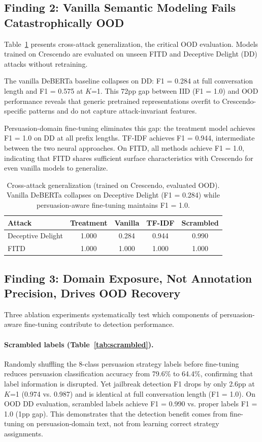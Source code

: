 \documentclass[11pt]{article}
\begin{document}
\subsection{Finding 2: Vanilla Semantic Modeling Fails Catastrophically OOD}

Table~\ref{tab:cross_attack} presents cross-attack generalization, the critical OOD evaluation. Models trained on Crescendo are evaluated on unseen FITD and Deceptive Delight (DD) attacks without retraining.

The vanilla DeBERTa baseline collapses on DD: F1 = 0.284 at full conversation length and F1 = 0.575 at $K$=1. This 72pp gap between IID (F1 = 1.0) and OOD performance reveals that generic pretrained representations overfit to Crescendo-specific patterns and do not capture attack-invariant features.

Persuasion-domain fine-tuning eliminates this gap: the treatment model achieves F1 = 1.0 on DD at all prefix lengths. TF-IDF achieves F1 = 0.944, intermediate between the two neural approaches. On FITD, all methods achieve F1 = 1.0, indicating that FITD shares sufficient surface characteristics with Crescendo for even vanilla models to generalize.

\begin{table}[t]
\centering
\caption{Cross-attack generalization (trained on Crescendo, evaluated OOD). Vanilla DeBERTa collapses on Deceptive Delight (F1 = 0.284) while persuasion-aware fine-tuning maintains F1 = 1.0.}
\label{tab:cross_attack}
\begin{tabular}{lcccc}
\toprule
\textbf{Attack} & \textbf{Treatment} & \textbf{Vanilla} & \textbf{TF-IDF} & \textbf{Scrambled} \\
\midrule
Deceptive Delight & 1.000 & 0.284 & 0.944 & 0.990 \\
FITD & 1.000 & 1.000 & 1.000 & 1.000 \\
\bottomrule
\end{tabular}
\end{table}

\subsection{Finding 3: Domain Exposure, Not Annotation Precision, Drives OOD Recovery}

Three ablation experiments systematically test which components of persuasion-aware fine-tuning contribute to detection performance.

\paragraph{Scrambled labels (Table~\ref{tab:scrambled}).}
Randomly shuffling the 8-class persuasion strategy labels before fine-tuning reduces persuasion classification accuracy from 79.6\% to 64.4\%, confirming that label information is disrupted. Yet jailbreak detection F1 drops by only 2.6pp at $K$=1 (0.974 vs. 0.987) and is identical at full conversation length (F1 = 1.0). On OOD DD evaluation, scrambled labels achieve F1 = 0.990 vs. proper labels F1 = 1.0 (1pp gap). This demonstrates that the detection benefit comes from fine-tuning on persuasion-domain text, not from learning correct strategy assignments.
\end{document}
